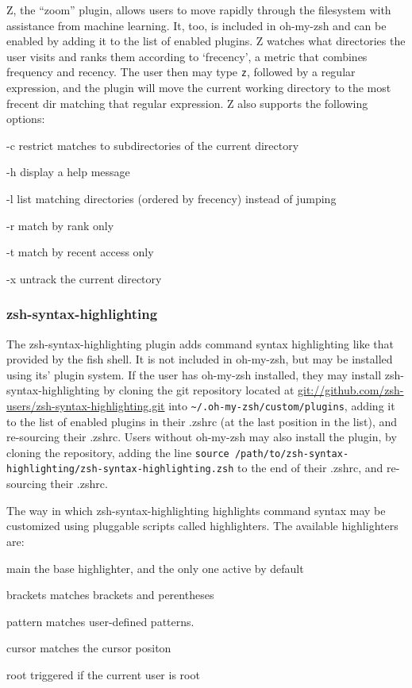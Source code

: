 \documentclass[12pt,a4paper]{article}
\begin{document}
				Z, the ``zoom'' plugin, allows users to move rapidly through the filesystem with assistance from machine learning. It, too, is included in oh-my-zsh and can be enabled by adding it to the list of enabled plugins. Z watches what directories the user visits and ranks them according to `frecency', a metric that combines frequency and recency. The user then may type \lstinline{z}, followed by a regular expression, and the plugin will move the current working directory to the most frecent dir matching that regular expression. Z also supports the following options:
				\begin{description}[leftmargin=3cm, style=sameline]
					\item[-c]{restrict matches to subdirectories of the current directory}
					\item[-h]{display a help message}
					\item[-l]{list matching directories (ordered by frecency) instead of jumping}
					\item[-r]{match by rank only}
					\item[-t]{match by recent access only}
					\item[-x]{untrack the current directory}
				\end{description}

			\subsubsection{zsh-syntax-highlighting}

				The zsh-syntax-highlighting plugin adds command syntax highlighting like that provided by the fish shell. It is not included in oh-my-zsh, but may be installed using its' plugin system. If the user has oh-my-zsh installed, they may install zsh-syntax-highlighting by cloning the git repository located at \url{git://github.com/zsh-users/zsh-syntax-highlighting.git} into \verb$~/.oh-my-zsh/custom/plugins$, adding it to the list of enabled plugins in their .zshrc (at the last position in the list), and re-sourcing their .zshrc. Users without oh-my-zsh may also install the plugin, by cloning the repository, adding the line \lstinline{source /path/to/zsh-syntax-highlighting/zsh-syntax-highlighting.zsh} to the end of their .zshrc, and re-sourcing their .zshrc.

				The way in which zsh-syntax-highlighting highlights command syntax may be customized using pluggable scripts called highlighters. The available highlighters are:
				\begin{description}[leftmargin=3cm, style=sameline]
					\item[main]{the base highlighter, and the only one active by default}
					\item[brackets]{matches brackets and perentheses}
					\item[pattern]{matches user-defined patterns.}
					\item[cursor]{matches the cursor positon}
					\item[root]{triggered if the current user is root}
				\end{description}
\end{document}
